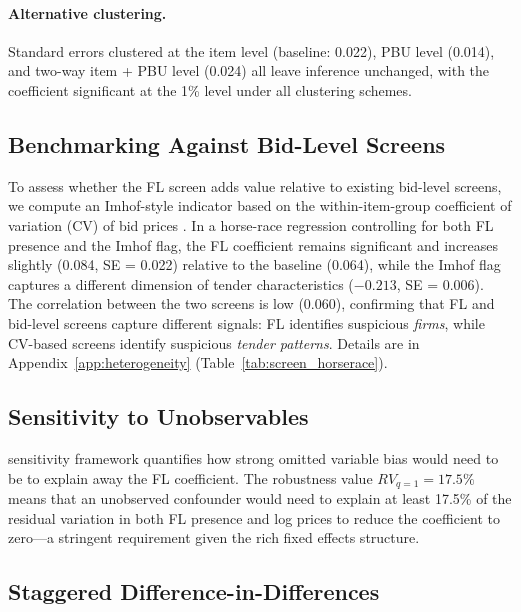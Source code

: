 \paragraph{Alternative clustering.}
Standard errors clustered at the item level (baseline: 0.022), PBU level
(0.014), and two-way item + PBU level (0.024) all leave inference
unchanged, with the coefficient significant at the 1\% level under all
clustering schemes.

\subsection{Benchmarking Against Bid-Level Screens} %

To assess whether the FL screen adds value relative to existing %
bid-level screens, we compute an Imhof-style indicator based on the
within-item-group coefficient of variation (CV) of bid prices
\citep{imhof2019detecting}. In a horse-race regression controlling for
both FL presence and the Imhof flag, the FL coefficient remains
significant and increases slightly (0.084, SE = 0.022) relative to the
baseline (0.064), while the Imhof flag captures a different dimension of
tender characteristics ($-0.213$, SE = 0.006). The correlation between
the two screens is low (0.060), confirming that FL and bid-level screens
capture different signals: FL identifies suspicious \emph{firms}, while
CV-based screens identify suspicious \emph{tender patterns}. Details are
in Appendix~\ref{app:heterogeneity}
(Table~\ref{tab:screen_horserace}).

\subsection{Sensitivity to Unobservables}

\cites{cinelli2020making} sensitivity framework quantifies how strong
omitted variable bias would need to be to explain away the FL
coefficient. The robustness value $RV_{q=1} = 17.5\%$ means that an
unobserved confounder would need to explain at least 17.5\% of the
residual variation in both FL presence and log prices to reduce the
coefficient to zero---a stringent requirement given the rich fixed
effects structure.

\subsection{Staggered Difference-in-Differences}

